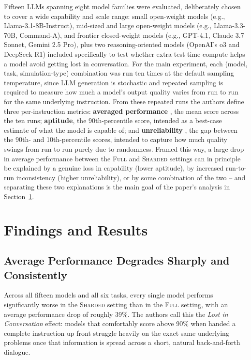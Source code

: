 \documentclass[manuscript,review]{acmart}
\begin{document}
Fifteen LLMs spanning eight model families were evaluated, deliberately chosen to cover a wide capability
and scale range: small open-weight models (e.g., Llama-3.1-8B-Instruct), mid-sized and large open-weight
models (e.g., Llama-3.3-70B, Command-A), and frontier closed-weight models (e.g., GPT-4.1, Claude 3.7
Sonnet, Gemini 2.5 Pro), plus two reasoning-oriented models (OpenAI's o3 and DeepSeek-R1) included
specifically to test whether extra test-time compute helps a model avoid getting lost in conversation. For
the main experiment, each (model, task, simulation-type) combination was run ten times at the default
sampling temperature, since LLM generation is stochastic and repeated sampling is required to measure how
much a model's output quality varies from run to run for the same underlying instruction. From these
repeated runs the authors define three per-instruction metrics: \textbf{averaged performance}
, the mean score across the ten runs; \textbf{aptitude}, the 90th-percentile
score, intended as a best-case estimate of what the model is capable of; and \textbf{unreliability}
, the gap between the 90th- and 10th-percentile scores, intended to capture how much quality
swings from run to run purely due to randomness. Framed this way, a large drop in average performance
between the \textsc{Full} and \textsc{Sharded} settings can in principle be explained by a genuine loss in
capability (lower aptitude), by increased run-to-run inconsistency (higher unreliability), or by some
combination of the two -- and separating these two explanations is the main goal of the paper's analysis in Section~\ref{sec:results}.


 
\section{Findings and Results}
\label{sec:results}

\subsection{Average Performance Degrades Sharply and Consistently}
 
Across all fifteen models and all six tasks, every single model performs significantly worse in the \textsc{Sharded} setting than in the \textsc{Full} setting, with an average performance drop of roughly 39\%. The authors call this the \emph{Lost in Conversation} effect: models that comfortably score above 90\% when handed a complete instruction up front struggle heavily on the exact same underlying problems once that information is spread across a short, natural back-and-forth dialogue. 
\end{document}
